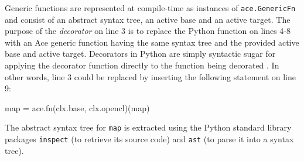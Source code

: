 \documentclass[10pt,preprint]{sigplanconf}
\begin{document}
{Generic functions are represented at compile-time as instances of \verb|ace.GenericFn| and consist of an abstract syntax tree, an {active base} and an {active target}. The purpose of the \emph{decorator} on line 3 is to replace the Python function on lines 4-8 with an Ace generic function having the same syntax tree and the provided active base and active target. 
Decorators in Python are simply syntactic sugar for applying the decorator function directly to the function  being decorated \cite{python}. In other words, line 3 could be replaced by inserting the following  statement on line 9:
\vspace{-0.28cm}
\begin{verbbox}
map = ace.fn(clx.base, clx.opencl)(map)
\end{verbbox}
\begin{figure}[h!]
\centering
\theverbbox
\end{figure}
\vspace{-0.28cm}

The abstract syntax tree for \verb|map| is extracted using the Python standard  library packages  \verb|inspect| (to retrieve its source code) and \verb|ast| (to parse it into a syntax tree). 

 
}
\end{document}
